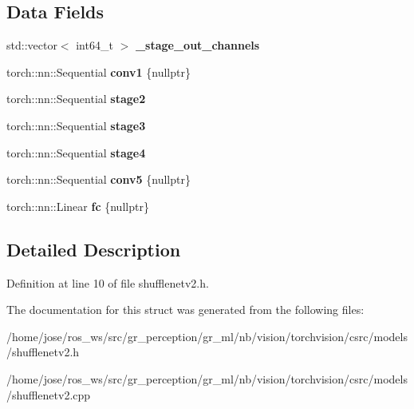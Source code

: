 \subsection*{Data Fields}
\begin{DoxyCompactItemize}
\item 
\mbox{\label{structvision_1_1models_1_1ShuffleNetV2Impl_a17eb6ef3be4bbe87432acc0403d17d24}} 
std\+::vector$<$ int64\+\_\+t $>$ {\bfseries \+\_\+stage\+\_\+out\+\_\+channels}
\item 
\mbox{\label{structvision_1_1models_1_1ShuffleNetV2Impl_a6f4195f18621aedf134960c5458cb652}} 
torch\+::nn\+::\+Sequential {\bfseries conv1} \{nullptr\}
\item 
\mbox{\label{structvision_1_1models_1_1ShuffleNetV2Impl_a9b921bf43e300f86372e21c9f19ec5ce}} 
torch\+::nn\+::\+Sequential {\bfseries stage2}
\item 
\mbox{\label{structvision_1_1models_1_1ShuffleNetV2Impl_a846ccea0ac5600b5c83fe33ea5e870ff}} 
torch\+::nn\+::\+Sequential {\bfseries stage3}
\item 
\mbox{\label{structvision_1_1models_1_1ShuffleNetV2Impl_aec0fbd6ccdbee8ea7c16589c6f2d72b4}} 
torch\+::nn\+::\+Sequential {\bfseries stage4}
\item 
\mbox{\label{structvision_1_1models_1_1ShuffleNetV2Impl_a27c9aa8c8147ec76827f486bfa46c32a}} 
torch\+::nn\+::\+Sequential {\bfseries conv5} \{nullptr\}
\item 
\mbox{\label{structvision_1_1models_1_1ShuffleNetV2Impl_ab351b987162fc957522a4c3fc3528f41}} 
torch\+::nn\+::\+Linear {\bfseries fc} \{nullptr\}
\end{DoxyCompactItemize}


\subsection{Detailed Description}


Definition at line 10 of file shufflenetv2.\+h.



The documentation for this struct was generated from the following files\+:\begin{DoxyCompactItemize}
\item 
/home/jose/ros\+\_\+ws/src/gr\+\_\+perception/gr\+\_\+ml/nb/vision/torchvision/csrc/models/shufflenetv2.\+h\item 
/home/jose/ros\+\_\+ws/src/gr\+\_\+perception/gr\+\_\+ml/nb/vision/torchvision/csrc/models/shufflenetv2.\+cpp\end{DoxyCompactItemize}
